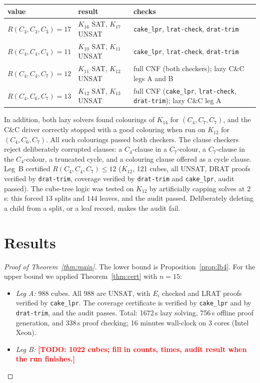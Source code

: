 \documentclass[11pt]{amsart}
\newcommand{\TODO}[1]{\textcolor{red}{\textbf{[TODO: #1]}}}
\theoremstyle{definition}
\theoremstyle{remark}
\begin{document}
\begin{center}
\begin{tabular}{lll}
\toprule
value & result & checks \\
\midrule
$R(C_3,C_3,C_3)=17$ \cite{Rad} & $K_{16}$ SAT, $K_{17}$ UNSAT & \texttt{cake\_lpr}, \texttt{lrat-check}, \texttt{drat-trim} \\
$R(C_4,C_4,C_4)=11$ \cite{Rad} & $K_{10}$ SAT, $K_{11}$ UNSAT & \texttt{cake\_lpr}, \texttt{lrat-check}, \texttt{drat-trim} \\
$R(C_4,C_4,C_7)=12$ \cite{SunYLZ2,Tse3} & $K_{11}$ SAT, $K_{12}$ UNSAT & full CNF (both checkers); lazy C\&C legs A and B \\
$R(C_4,C_6,C_7)=13$ \cite{SunYWLX,Tse3} & $K_{12}$ SAT, $K_{13}$ UNSAT & full CNF (\texttt{cake\_lpr}, \texttt{lrat-check}, \texttt{drat-trim}); lazy C\&C leg A \\
\bottomrule
\end{tabular}
\end{center}
\noindent In addition, both lazy solvers found colourings of $K_{14}$ for $(C_4,C_7,C_7)$, and the C\&C driver correctly stopped
with a good colouring when run on $K_{12}$ for $(C_4,C_6,C_7)$. All such colourings passed both checkers. The clause checkers reject
deliberately corrupted clauses: a $C_4$-clause in a $C_7$-colour, a $C_7$-clause in the $C_4$-colour, a truncated cycle, and a
colouring clause offered as a cycle clause. Leg~B certified $R(C_4,C_4,C_7)\le 12$ ($K_{12}$, 121 cubes, all UNSAT, DRAT proofs verified by
\texttt{drat-trim}, coverage verified by \texttt{drat-trim} and \texttt{cake\_lpr}, audit passed). The cube-tree logic was tested on
$K_{12}$ by artificially capping solves at $2$\,s: this forced $13$ splits and $144$ leaves, and the audit passed. Deliberately deleting a
child from a split, or a leaf record, makes the audit fail.

\section{Results}\label{sec:results}

\begin{proof}[Proof of Theorem~\ref{thm:main}]
The lower bound is Proposition~\ref{prop:lb4}. For the upper bound we applied Theorem~\ref{thm:cert} with $n=15$:
\begin{itemize}
\item \emph{Leg A:} 988 cubes. All 988 are UNSAT, with $E_i$ checked and LRAT proofs verified by \texttt{cake\_lpr}. The coverage
certificate is verified by \texttt{cake\_lpr} and by \texttt{drat-trim}, and the audit passes. Total: 1672\,s lazy solving, 756\,s
offline proof generation, and 338\,s proof checking; 16 minutes wall-clock on 3 cores (Intel Xeon).
\item \emph{Leg B:} \TODO{1022 cubes; fill in counts, times, audit result when the run finishes.}
\end{itemize}
\end{proof}
\end{document}
